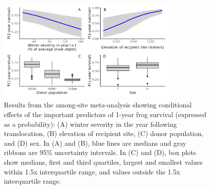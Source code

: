 \documentclass[9pt,twocolumn,twoside,lineno]{pnas-new}
\begin{document}
\begin{figure}

{\centering \includegraphics[width=0.80\textwidth]{figures/cond_effects_plot.png}

}

\caption{\label{fig-cond-effects}Results from the among-site
meta-analysis showing conditional effects of the important predictors of
1-year frog survival (expressed as a probability): (A) winter severity
in the year following translocation, (B) elevation of recipient site,
(C) donor population, and (D) sex. In (A) and (B), blue lines are
medians and gray ribbons are 95\% uncertainty intervals. In (C) and (D),
box plots show medians, first and third quartiles, largest and smallest
values within 1.5x interquartile range, and values outside the 1.5x
interquartile range.}

\end{figure}

\newpage
\end{document}
